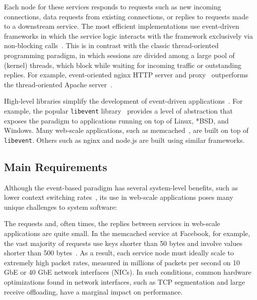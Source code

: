 Each node for these services responds to requests such as new incoming
connections, data requests from existing connections, or replies to
requests made to a downstream service.  The most efficient
implementations use event-driven frameworks in which the service logic
interacts with the framework exclusively via non-blocking
calls~\cite{DBLP:conf/usenix/PaiDZ99,missing,missing}. This is in
contrast with the classic thread-oriented programming paradigm, in
which sessions are divided among a large pool of (kernel) threads,
which block while waiting for incoming traffic or outstanding
replies. For example, event-oriented nginx HTTP server and
proxy~\cite{reese2008nginx} outperforms the thread-oriented Apache
server~\cite{misc:apache}.

High-level libraries simplify the development of event-driven
applications~\cite{provos2003libevent,libev,libuv}.  For example, the
popular \texttt{libevent} library~\cite{provos2003libevent} provides a
level of abstraction that exposes the paradigm to applications running
on top of Linux, *BSD, and Windows.  Many web-scale applications, such
as memcached~\cite{missing}, are built on top of \texttt{libevent}.  Others
such as nginx and node.js are built using similar frameworks.


\subsection{Main Requirements}
\label{sec:motivation:challenges}

Although the event-based paradigm has several system-level benefits,
such as lower context switching rates~\cite{missing}, its use in web-scale
applications poses many unique challenges to system software:

 The requests and, often times, the replies
between services in web-scale applications are quite small. In the
memcached service at Facebook, for example, the vast majority of
requests use keys shorter than 50 bytes and involve values shorter
than 500 bytes~\cite{Atikoglu:2012:WAL}. As a result, each service
node must ideally scale to extremely high packet rates, measured in
millions of packets per second on 10 GbE or 40 GbE network interfaces (NICs).
In such conditions, common hardware optimizations found in network
interfaces, such as TCP segmentation and large receive offloading,
have a marginal impact on performance. 

